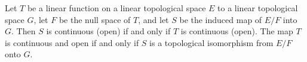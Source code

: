 Let $T$ be a linear function on a linear topological space $E$ to a linear topological space $G$, let $F$ be the null space of $T$, and let $S$ be the induced map of $E/F$ into $G$. Then $S$ is continuous (open) if and only if $T$ is continuous (open). The map $T$ is continuous and open if and only if $S$ is a topological isomorphism from $E/F$ onto $G$.
